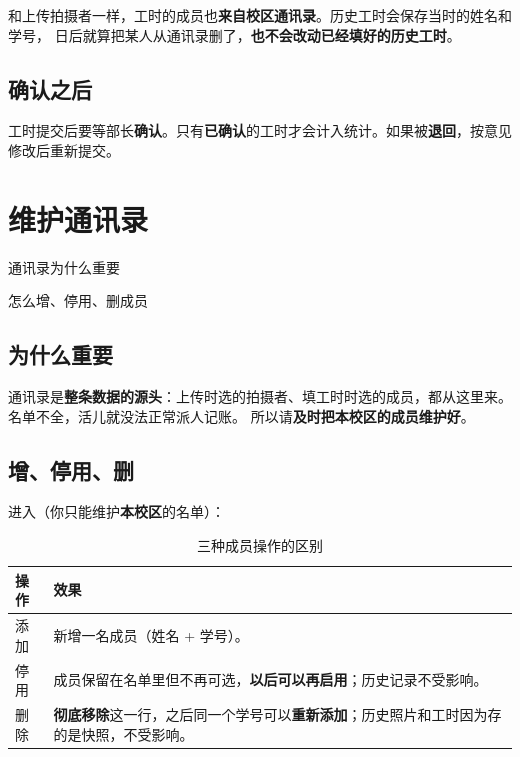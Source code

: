 \documentclass[cn,11pt,green]{elegantbook}
\begin{document}
\begin{notebox}[填报人来自通讯录]
  和上传拍摄者一样，工时的成员也\textbf{来自校区通讯录}。历史工时会保存当时的姓名和学号，
  日后就算把某人从通讯录删了，\textbf{也不会改动已经填好的历史工时}。
\end{notebox}

\section{确认之后}

工时提交后要等部长\textbf{确认}。只有\textbf{已确认}的工时才会计入统计。如果被\textbf{退回}，按意见修改后重新提交。

\chapter{维护通讯录}

\begin{introduction}
  \item 通讯录为什么重要
  \item 怎么增、停用、删成员
\end{introduction}

\section{为什么重要}

通讯录是\textbf{整条数据的源头}：上传时选的拍摄者、填工时时选的成员，都从这里来。名单不全，活儿就没法正常派人记账。
所以请\textbf{及时把本校区的成员维护好}。

\section{增、停用、删}

进入（你只能维护\textbf{本校区}的名单）：

\begin{table}[htbp]
  \centering
  \caption{三种成员操作的区别}
  \begin{tabular}{L{2.2cm} L{10cm}}
    \toprule
    \textbf{操作} & \textbf{效果} \\
    \midrule
    添加 & 新增一名成员（姓名 + 学号）。 \\
    停用 & 成员保留在名单里但不再可选，\textbf{以后可以再启用}；历史记录不受影响。 \\
    删除 & \textbf{彻底移除}这一行，之后同一个学号可以\textbf{重新添加}；历史照片和工时因为存的是快照，不受影响。 \\
    \bottomrule
  \end{tabular}
\end{table}
\end{document}
